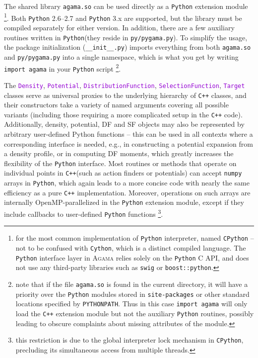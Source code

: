 \documentclass[12pt]{article}
\newcommand{\Agama}{\textsc{Agama}\xspace}
\newcommand{\Cpp}  {\texttt{C++}\xspace}
\newcommand{\Python}{\texttt{Python}\xspace}
\newcommand{\ttt}[1]{\textcolor{darkviolet}{\texttt{#1}}}
\begin{document}
The shared library \texttt{agama.so} can be used directly as a \Python extension module%
\footnote{for the most common implementation of \Python interpreter, named \texttt{CPython} -- not to be confused with \texttt{Cython}, which is a distinct compiled language. The \Python interface layer in \Agama relies solely on the \Python C API, and does not use any third-party libraries such as \texttt{swig} or \texttt{boost::python}.}. Both \Python 2.6--2.7 and \Python 3.x are supported, but the library must be compiled separately for either version. In addition, there are a few auxiliary routines written in \Python (they reside in \texttt{py/pygama.py}). To simplify the usage, the package initialization (\texttt{__init__.py}) imports everything from both \texttt{agama.so} and \texttt{py/pygama.py} into a single namespace, which is what you get by writing \texttt{import agama} in your \Python script%
\footnote{note that if the file \texttt{agama.so} is found in the current directory, it will have a priority over the \Python modules stored in \texttt{site-packages} or other standard locations specified by \texttt{PYTHONPATH}. Thus in this case \texttt{import agama} will only load the \Cpp extension module but not the auxiliary \Python routines, possibly leading to obscure complaints about missing attributes of the module.}.

The \ttt{Density}, \ttt{Potential}, \ttt{DistributionFunction}, \ttt{SelectionFunction}, \ttt{Target} classes serve as universal proxies to the underlying hierarchy of \Cpp classes, and their constructors take a variety of named arguments covering all possible variants (including those requiring a more complicated setup in the \Cpp code).
Additionally, density, potential, DF and SF objects may also be represented by arbitrary user-defined Python functions -- this can be used in all contexts where a corresponding interface is needed, e.g., in constructing a potential expansion from a density profile, or in computing DF moments, which greatly increases the flexibility of the \Python interface. Most routines or methods that operate on individual points in \Cpp (such as action finders or potentials) can accept \texttt{numpy} arrays in \Python, which again leads to a more concise code with nearly the same efficiency as a pure \Cpp implementation. Moreover, operations on such arrays are internally OpenMP-parallelized in the \Python extension module, except if they include callbacks to user-defined \Python functions%
\footnote{this restriction is due to the global interpreter lock mechanism in \texttt{CPython}, precluding its simultaneous access from multiple threads.}.
\end{document}
